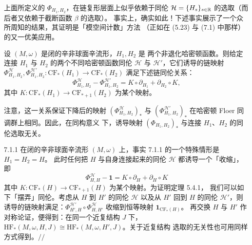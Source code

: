 上面所定义的 $\Phi_{H_1,H_2}$，在链复形层面上似乎依赖于同伦
$\mathcal{H}=\{H_s\}_{s\in\mathbb{R}}$ 的选取（而后者又依赖于截断函数 $\beta$ 的选取）。
事实上，确实如此！下述事实展示了一个众所周知的结果，其证明是「模空间计数」方法
（正如在 (5.23) 与 (7.1) 中那样）的又一优美应用。

设 $(M,\omega)$ 是闭的辛非球面辛流形，$H_1,H_2$ 是
两个非退化哈密顿函数。则给定连接 $H_1$ 与 $H_2$ 的两个不同哈密顿函数同伦
$\mathcal{H}$ 与 $\mathcal{H}'$，它们诱导的链映射
$\Phi^{\mathcal{H}}_{H_1,H_2},\Phi^{\mathcal{H}'}_{H_1,H_2}\colon
\mathrm{CF}_*(H_1)\to\mathrm{CF}_*(H_2)$ 满足下述链同伦关系：
\[
  \Phi^{\mathcal{H}}_{H_1,H_2}-\Phi^{\mathcal{H}'}_{H_1,H_2}
  =K\circ\partial_{H_1}+\partial_{H_2}\circ K,
\]
其中 $K\colon\mathrm{CF}_*(H_1)\to\mathrm{CF}_{*+1}(H_2)$ 为某个映射。


注意，这一关系保证下降后的映射 $(\Phi^{\mathcal{H}}_{H_1,H_2})_*$ 与
$(\Phi^{\mathcal{H}'}_{H_1,H_2})_*$ 在哈密顿 Floer 同调群上相同。因此，在同构意义
下，诱导映射 $(\Phi_{H_1,H_2})_*$ 与连接 $H_1$、$H_2$ 的同伦选取无关。

\begin{wexam}{7.1.1}
  在闭的辛非球面辛流形 $(M,\omega)$ 上，事实 7.1.1 的一个特殊情形是 $H_1=H_2=H$。
  此时任何把 $H$ 与自身连接起来的同伦 $\mathcal{H}$ 都诱导一个「收缩」，即
  \[
    \Phi^{\mathcal{H}}_{H,H}-\mathbf{1}
    =K\circ\partial_H+\partial_H\circ K
  \]
  其中 $K\colon\mathrm{CF}_*(H)\to\mathrm{CF}_{*+1}(H)$ 为某个映射。为证明定理 5.4.1，
  我们可以如下「摆弄」同伦。考虑从 $H$ 到 $H'$ 的同伦 $\mathcal{H}$ 以及从 $H'$
  回到 $H$ 的同伦 $\mathcal{H}'$，则诱导的链映射满足：$\Phi^{\mathcal{H}'}_{H',H}
  \circ\Phi^{\mathcal{H}}_{H,H'}$ 收缩到恒等映射 $\mathbf{1}_{\mathrm{CF}_*(H)}$。
  再交换 $H$ 与 $H'$ 作对称论证，便得到：在同一个近复结构 $J$ 下，
  $\mathrm{HF}_*(M,\omega,H,J)\cong\mathrm{HF}_*(M,\omega,H',J)$。关于近复结构
  选取的无关性也可用同样方式得到。\hfill$//$
\end{wexam}

